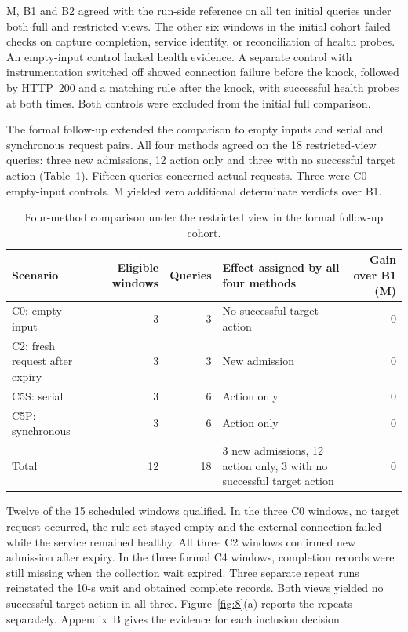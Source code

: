 M, B1 and B2 agreed with the run-side reference on all ten initial queries under both full and restricted views. The other six windows in the initial cohort failed checks on capture completion, service identity, or reconciliation of health probes. An empty-input control lacked health evidence. A separate control with instrumentation switched off showed connection failure before the knock, followed by HTTP~200 and a matching rule after the knock, with successful health probes at both times. Both controls were excluded from the initial full comparison.

The formal follow-up extended the comparison to empty inputs and serial and synchronous request pairs. All four methods agreed on the 18 restricted-view queries: three new admissions, 12 action only and three with no successful target action (Table~\ref{tab:6}). Fifteen queries concerned actual requests. Three were C0 empty-input controls. M yielded zero additional determinate verdicts over B1.

\begin{table}[t]
\centering
\caption{Four-method comparison under the restricted view in the formal follow-up cohort.}
\label{tab:6}
\small
\begin{tabularx}{\textwidth}{@{}p{}r r X r@{}}
\toprule
Scenario & Eligible windows & Queries & Effect assigned by all four methods & Gain over B1 (M) \\
\midrule
C0: empty input & 3 & 3 & No successful target action & 0 \\
C2: fresh request after expiry & 3 & 3 & New admission & 0 \\
C5S: serial & 3 & 6 & Action only & 0 \\
C5P: synchronous & 3 & 6 & Action only & 0 \\
\midrule
Total & 12 & 18 & 3 new admissions, 12 action only, 3 with no successful target action & 0 \\
\bottomrule
\end{tabularx}
\end{table}

Twelve of the 15 scheduled windows qualified. In the three C0 windows, no target request occurred, the rule set stayed empty and the external connection failed while the service remained healthy. All three C2 windows confirmed new admission after expiry. In the three formal C4 windows, completion records were still missing when the collection wait expired. Three separate repeat runs reinstated the 10-s wait and obtained complete records. Both views yielded no successful target action in all three. Figure~\ref{fig:8}(a) reports the repeats separately. Appendix~B gives the evidence for each inclusion decision.

